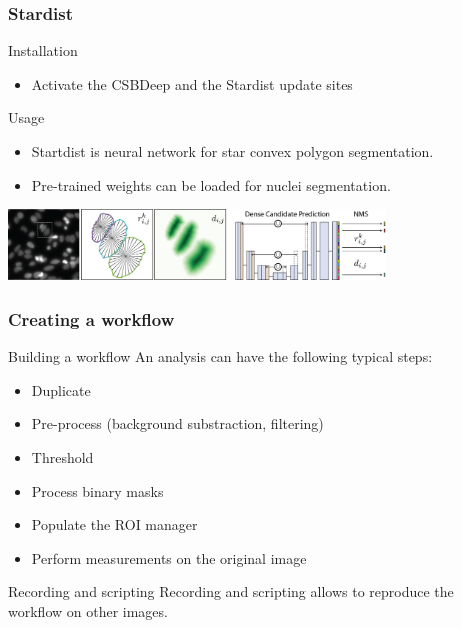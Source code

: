 \documentclass[ignorenonframetext,aspectratio=169,10pt,xcolor=table]{beamer}
\begin{document}
\begin{frame} \frametitle{Stardist}

  \begin{block}{Installation}
    \begin{itemize}
    \item Activate the CSBDeep and the Stardist update sites
    \end{itemize}
  \end{block}
  \begin{block}{Usage}
    \begin{itemize}
    \item Startdist is neural network for star convex polygon segmentation.
    \item Pre-trained weights can be loaded for nuclei segmentation.
    \end{itemize}
    \begin{center}
      \includegraphics[width=0.75\textwidth]{stardist}
    \end{center}
  \end{block}

  \centering

\end{frame}

\begin{frame} \frametitle{Creating a workflow}

  \begin{block}{Building a workflow}
    An analysis can have the following typical steps:
    \begin{itemize}
      \item Duplicate
      \item Pre-process (background substraction, filtering)
      \item Threshold
      \item Process binary masks
      \item Populate the ROI manager
      \item Perform measurements on the original image
    \end{itemize}
  \end{block}

  \begin{block}{Recording and scripting}
    Recording and scripting allows to reproduce the workflow on other images.
  \end{block}

\end{frame}
\end{document}
